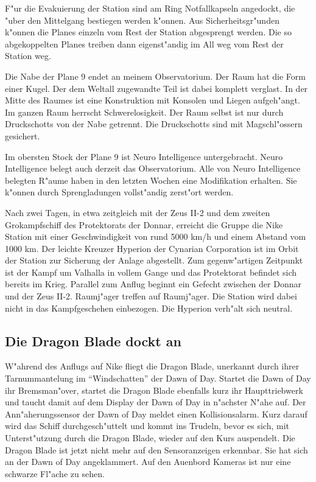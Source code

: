 F"ur die Evakuierung der Station sind am Ring Notfallkapseln angedockt, die "uber den Mittelgang bestiegen werden k"onnen. Aus Sicherheitsgr"unden k"onnen die Planes einzeln vom Rest der Station abgesprengt werden. Die so abgekoppelten Planes treiben dann eigenst"andig im All weg vom Rest der Station weg. 

Die Nabe der Plane 9 endet an meinem Observatorium. Der Raum hat die Form einer Kugel. Der dem Weltall zugewandte Teil ist dabei komplett verglast. In der Mitte des Raumes ist eine Konstruktion mit Konsolen und Liegen aufgeh"angt. Im ganzen Raum herrscht Schwerelosigkeit. Der Raum selbst ist nur durch Druckschotts von der Nabe getrennt. Die Druckschotts sind mit Magschl"ossern gesichert. 

Im obersten Stock der Plane 9 ist Neuro Intelligence untergebracht. Neuro Intelligence belegt auch derzeit das Observatorium. Alle von Neuro Intelligence belegten R"aume haben in den letzten Wochen eine Modifikation erhalten. Sie k"onnen durch Sprengladungen vollst"andig zerst"ort werden.



Nach zwei Tagen, in etwa zeitgleich mit der Zeus II-2 und dem zweiten Gro\3kampfschiff des Protektorats der Donnar, erreicht die Gruppe die Nike Station mit einer Geschwindigkeit von rund 5000 km/h und einem Abstand vom 1000 km. Der leichte Kreuzer Hyperion der Cynarian Corporation ist im Orbit der Station zur Sicherung der Anlage abgestellt. Zum gegenw"artigen Zeitpunkt ist der Kampf um Valhalla in vollem Gange und das Protektorat befindet sich bereits im Krieg. Parallel zum Anflug beginnt ein Gefecht zwischen der Donnar und der Zeus II-2. Raumj"ager treffen auf Raumj"ager. Die Station wird dabei nicht in das Kampfgeschehen einbezogen. Die Hyperion verh"alt sich neutral.

\subsection{Die Dragon Blade dockt an}
W"ahrend des Anflugs auf Nike fliegt die Dragon Blade, unerkannt durch ihrer Tarnummantelung im "`Windschatten"' der Dawn of Day. Startet die Dawn of Day ihr Bremsman"over, startet die Dragon Blade ebenfalls kurz ihr Haupttriebwerk und taucht damit auf dem Display der Dawn of Day in n"achster N"ahe auf. Der Ann"aherungssensor der Dawn of Day meldet einen Kollisionsalarm. Kurz darauf wird das Schiff durchgesch"uttelt und kommt ins Trudeln, bevor es sich, mit Unterst"utzung durch die Dragon Blade, wieder auf den Kurs auspendelt. Die Dragon Blade ist jetzt nicht mehr auf den Sensoranzeigen erkennbar. Sie hat sich an der Dawn of Day angeklammert. Auf den Au\3enbord Kameras ist nur eine schwarze Fl"ache zu sehen.

